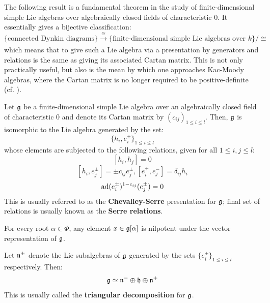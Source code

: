         The following result is a fundamental theorem in the study of finite-dimensional simple Lie algebras over algebraically closed fields of characteristic $0$. It essentially gives a bijective classification:
            $$\{ \text{connected Dynkin diagrams} \} \xrightarrow[]{\cong} \{ \text{finite-dimensional simple Lie algebras over $k$} \}/\cong$$
        which means that to give such a Lie algebra via a presentation by generators and relations is the same as giving its associated Cartan matrix. This is not only practically useful, but also is the mean by which one approaches Kac-Moody algebras, where the Cartan matrix is no longer required to be positive-definite (cf. \cite[Chapters 1-5]{kac_infinite_dimensional_lie_algebras}). 
        \begin{theorem}
            Let $\mathfrak{g}$ be a finite-dimensional simple Lie algebra over an algebraically closed field of characteristic $0$ and denote its Cartan matrix by $(c_{ij})_{1 \leq i \leq l}$. Then, $\mathfrak{g}$ is isomorphic to the Lie algebra generated by the set:
                $$\{h_i, e_i^{\pm}\}_{1 \leq i \leq l}$$
            whose elements are subjected to the following relations, given for all $1 \leq i, j \leq l$:
                $$[h_i, h_j] = 0$$
                $$[h_i, e_j^{\pm}] = \pm c_{ij} e_j^{\pm}, [e_i^+, e_j^-] = \delta_{ij} h_i$$
                $$\mathrm{ad}(e_i^{\pm})^{1 - c_{ij}}(e_j^{\pm}) = 0$$
            This is usually referred to as the \textbf{Chevalley-Serre} presentation for $\mathfrak{g}$; final set of relations is usually known as the \textbf{Serre relations}.
        \end{theorem}
        \begin{corollary}
            For every root $\alpha \in \Phi$, any element $x \in \mathfrak{g}[\alpha]$ is nilpotent under the vector representation of $\mathfrak{g}$. 
        \end{corollary}
        \begin{corollary}
            Let $\mathfrak{n}^{\pm}$ denote the Lie subalgebras of $\mathfrak{g}$ generated by the sets $\{e_i^{\pm}\}_{1 \leq i \leq l}$ respectively. Then:
                $$\mathfrak{g} \simeq \mathfrak{n}^- \oplus \mathfrak{h} \oplus \mathfrak{n}^+$$
            This is usually called the \textbf{triangular decomposition} for $\mathfrak{g}$. 
        \end{corollary}

